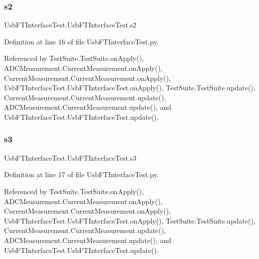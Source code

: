 \mbox{\label{classUsbFTInterfaceTest_1_1UsbFTInterfaceTest_a38fa405de4975926328529eb221ac20d}} 
\subsubsection{\texorpdfstring{s2}{s2}}
{\footnotesize\ttfamily Usb\+F\+T\+Interface\+Test.\+Usb\+F\+T\+Interface\+Test.\+s2}



Definition at line 16 of file Usb\+F\+T\+Interface\+Test.\+py.



Referenced by Test\+Suite.\+Test\+Suite.\+on\+Apply(), A\+D\+C\+Measurement.\+Current\+Measurement.\+on\+Apply(), Current\+Measurement.\+Current\+Measurement.\+on\+Apply(), Usb\+F\+T\+Interface\+Test.\+Usb\+F\+T\+Interface\+Test.\+on\+Apply(), Test\+Suite.\+Test\+Suite.\+update(), Current\+Measurement.\+Current\+Measurement.\+update(), A\+D\+C\+Measurement.\+Current\+Measurement.\+update(), and Usb\+F\+T\+Interface\+Test.\+Usb\+F\+T\+Interface\+Test.\+update().

\mbox{\label{classUsbFTInterfaceTest_1_1UsbFTInterfaceTest_a7a9156c9fcbfe6ae5eef76a407d3eb0e}} 
\subsubsection{\texorpdfstring{s3}{s3}}
{\footnotesize\ttfamily Usb\+F\+T\+Interface\+Test.\+Usb\+F\+T\+Interface\+Test.\+s3}



Definition at line 17 of file Usb\+F\+T\+Interface\+Test.\+py.



Referenced by Test\+Suite.\+Test\+Suite.\+on\+Apply(), A\+D\+C\+Measurement.\+Current\+Measurement.\+on\+Apply(), Current\+Measurement.\+Current\+Measurement.\+on\+Apply(), Usb\+F\+T\+Interface\+Test.\+Usb\+F\+T\+Interface\+Test.\+on\+Apply(), Test\+Suite.\+Test\+Suite.\+update(), Current\+Measurement.\+Current\+Measurement.\+update(), A\+D\+C\+Measurement.\+Current\+Measurement.\+update(), and Usb\+F\+T\+Interface\+Test.\+Usb\+F\+T\+Interface\+Test.\+update().

